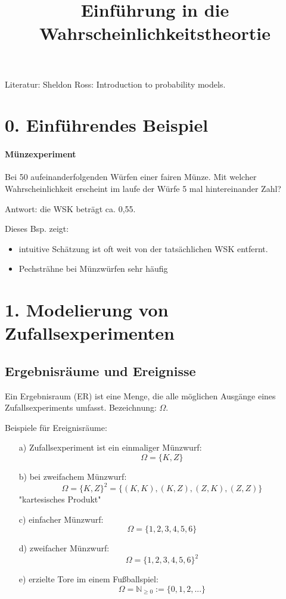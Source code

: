 \documentclass[10pt,a4paper,titlepage]{book}
\title{Einführung in die Wahrscheinlichkeitstheortie}
\begin{document}
\maketitle
\newpage
\tableofcontents
\newpage

Literatur: Sheldon Ross: Introduction to probability models.
\section{0. Einführendes Beispiel}
\paragraph{Münzexperiment}
Bei 50 aufeinanderfolgenden Würfen einer fairen Münze. Mit welcher Wahrscheinlichkeit erscheint im laufe der Würfe 5 mal hintereinander Zahl?

Antwort: die WSK beträgt ca. 0,55.

Dieses Bsp. zeigt:
\begin{itemize}
\item intuitive Schätzung ist oft weit von der tatsächlichen WSK entfernt.
\item Pechsträhne bei Münzwürfen sehr häufig
\end{itemize}
\section{1. Modelierung von Zufallsexperimenten}
\subsection{Ergebnisräume und Ereignisse}
Ein Ergebnisraum (ER) ist eine Menge, die alle möglichen Ausgänge eines Zufallsexperiments umfasst.
Bezeichnung: $\Omega$.

Beispiele für Ereignisräume:
\begin{itemize}
\item [a)] Zufallsexperiment ist ein einmaliger Münzwurf:
$$\Omega = \{K, Z\}$$
\item [b)] bei zweifachem Münzwurf:\\
$$\Omega = \{K, Z\}^2 = \{(K,K), (K,Z), (Z,K), (Z,Z)\}$$
"kartesisches Produkt"
\item [c)] einfacher Münzwurf:
$$\Omega = \{1,2,3,4,5,6\}$$
\item [d)] zweifacher Münzwurf:
$$\Omega = \{1,2,3,4,5,6\}^2$$
\item [e)] erzielte Tore im einem Fußballspiel:
$$\Omega =  \mathbb{N}_{\geq 0}:=\{0,1,2,...\}$$
\end{itemize}
\end{document}
